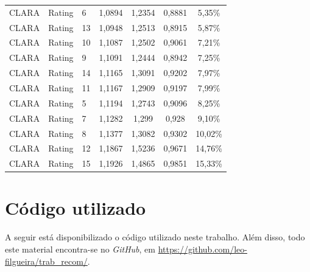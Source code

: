\documentclass[12pt,a4paper,header]{abnt}
\begin{document}
{\begin{longtable}{@{}lllcccc@{}}
CLARA & Rating & 6 & 1,0894 & 1,2354 & 0,8881 & 5,35\% \\
CLARA & Rating & 13 & 1,0948 & 1,2513 & 0,8915 & 5,87\% \\
CLARA & Rating & 10 & 1,1087 & 1,2502 & 0,9061 & 7,21\% \\
CLARA & Rating & 9 & 1,1091 & 1,2444 & 0,8942 & 7,25\% \\
CLARA & Rating & 14 & 1,1165 & 1,3091 & 0,9202 & 7,97\% \\
CLARA & Rating & 11 & 1,1167 & 1,2909 & 0,9197 & 7,99\% \\
CLARA & Rating & 5 & 1,1194 & 1,2743 & 0,9096 & 8,25\% \\
CLARA & Rating & 7 & 1,1282 & 1,299 & 0,928 & 9,10\% \\
CLARA & Rating & 8 & 1,1377 & 1,3082 & 0,9302 & 10,02\% \\
CLARA & Rating & 12 & 1,1867 & 1,5236 & 0,9671 & 14,76\% \\
CLARA & Rating & 15 & 1,1926 & 1,4865 & 0,9851 & 15,33\% \\* \bottomrule
\end{longtable}
}

\chapter{Código utilizado}

A seguir está disponibilizado o código utilizado neste trabalho. Além disso, todo este material encontra-se no \textit{GitHub}, em \url{https://github.com/leo-filgueira/trab_recom/}.
\end{document}
